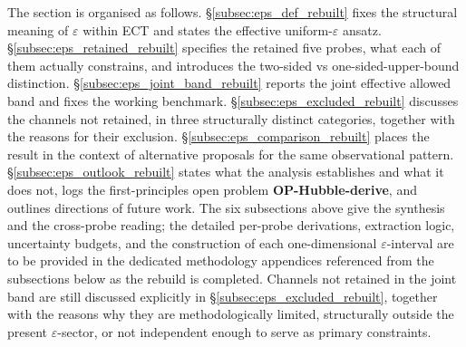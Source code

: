 The section is organised as follows.
\S\ref{subsec:eps_def_rebuilt} fixes the structural meaning of
$\varepsilon$ within ECT and states the effective uniform-$\varepsilon$
ansatz. \S\ref{subsec:eps_retained_rebuilt} specifies the retained
five probes, what each of them actually constrains, and introduces the
two-sided vs one-sided-upper-bound distinction.
\S\ref{subsec:eps_joint_band_rebuilt} reports the joint effective
allowed band and fixes the working benchmark.
\S\ref{subsec:eps_excluded_rebuilt} discusses the channels not
retained, in three structurally distinct categories, together with the
reasons for their exclusion.
\S\ref{subsec:eps_comparison_rebuilt} places the result in the context
of alternative proposals for the same observational pattern.
\S\ref{subsec:eps_outlook_rebuilt} states what the analysis
establishes and what it does not, logs the first-principles open
problem \textbf{OP-Hubble-derive}, and outlines directions of future
work. The six subsections above give the synthesis and the cross-probe
reading; the detailed per-probe derivations, extraction logic,
uncertainty budgets, and the construction of each one-dimensional
$\varepsilon$-interval are to be provided in the dedicated methodology
appendices referenced from the subsections below as the rebuild is
completed. Channels not
retained in the joint band are still discussed explicitly in
\S\ref{subsec:eps_excluded_rebuilt}, together with the reasons why
they are methodologically limited, structurally outside the present
$\varepsilon$-sector, or not independent enough to serve as primary
constraints.

